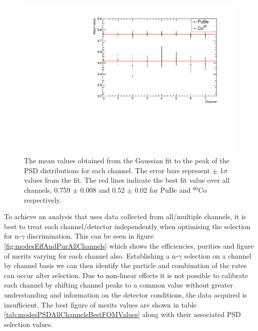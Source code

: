 \begin{figure}[htbp]
\begin{center}
\includegraphics[width=120mm]{Chapter8/figures/pdsMeanValuesPerChannel_SigmaErrors_withFit.pdf}
\caption{The mean values obtained from the Gaussian fit to the peak of the PSD distributions for each channel. The error bars represent $\pm$ 1$\sigma$ values from the fit. The red lines indicate the best fit value over all channels, 0.759 $\pm$ 0.008 and 0.52 $\pm$ 0.02 for PuBe and $^{60}$Co respectively. }
\label{fig:modesPSDMeanForChannels}
\end{center}
\end{figure}

To achieve an analysis that uses data collected from all/multiple channels, it is best to treat each channel/detector independently when optimising the selection for n-$\gamma$ discrimination. This can be seen in figure \ref{fig:modesEffAndPurAllChannels} which shows the efficiencies, purities and figure of merits varying for each channel also. Establishing a n-$\gamma$ selection on a channel by channel basis we can then identify the particle and combination of the rates can occur after selection. Due to non-linear effects it is not possible to calibrate each channel by shifting channel peaks to a common value without greater understanding and information on the detector conditions, the data acquired is insufficient. The best figure of merits values are shown in table \ref{tab:modesPSDAllChannelsBestFOMValues} along with their associated PSD selection values.


